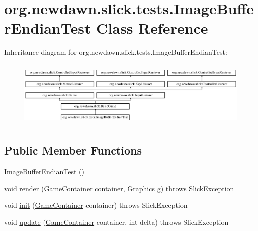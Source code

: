 \hypertarget{classorg_1_1newdawn_1_1slick_1_1tests_1_1_image_buffer_endian_test}{}\section{org.\+newdawn.\+slick.\+tests.\+Image\+Buffer\+Endian\+Test Class Reference}
\label{classorg_1_1newdawn_1_1slick_1_1tests_1_1_image_buffer_endian_test}
Inheritance diagram for org.\+newdawn.\+slick.\+tests.\+Image\+Buffer\+Endian\+Test\+:\begin{figure}[H]
\begin{center}
\leavevmode
\includegraphics[height=3.240741cm]{classorg_1_1newdawn_1_1slick_1_1tests_1_1_image_buffer_endian_test}
\end{center}
\end{figure}
\subsection*{Public Member Functions}
\begin{DoxyCompactItemize}
\item 
\mbox{\hyperlink{classorg_1_1newdawn_1_1slick_1_1tests_1_1_image_buffer_endian_test_a22116623ff2ea6f5a788e63d9fa61508}{Image\+Buffer\+Endian\+Test}} ()
\item 
void \mbox{\hyperlink{classorg_1_1newdawn_1_1slick_1_1tests_1_1_image_buffer_endian_test_a6d3562057b0c05a9fd2156691abd7229}{render}} (\mbox{\hyperlink{classorg_1_1newdawn_1_1slick_1_1_game_container}{Game\+Container}} container, \mbox{\hyperlink{classorg_1_1newdawn_1_1slick_1_1_graphics}{Graphics}} g)  throws Slick\+Exception 
\item 
void \mbox{\hyperlink{classorg_1_1newdawn_1_1slick_1_1tests_1_1_image_buffer_endian_test_a106a9a68d31e9a9f6bf2bdebc0d95f64}{init}} (\mbox{\hyperlink{classorg_1_1newdawn_1_1slick_1_1_game_container}{Game\+Container}} container)  throws Slick\+Exception 
\item 
void \mbox{\hyperlink{classorg_1_1newdawn_1_1slick_1_1tests_1_1_image_buffer_endian_test_a8f249cc7e62b0c349071fb427bb119fe}{update}} (\mbox{\hyperlink{classorg_1_1newdawn_1_1slick_1_1_game_container}{Game\+Container}} container, int delta)  throws Slick\+Exception 
\end{DoxyCompactItemize}

